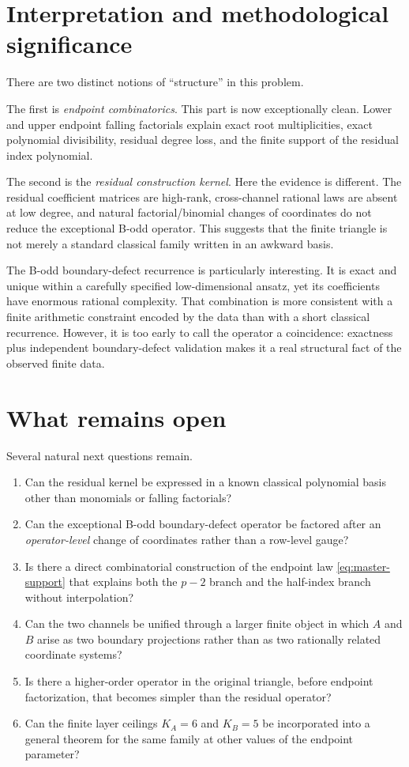 \documentclass[11pt,a4paper]{article}
\begin{document}
\section{Interpretation and methodological significance}

There are two distinct notions of ``structure'' in this problem.

The first is \emph{endpoint combinatorics}.  This part is now exceptionally clean.  Lower and upper endpoint falling factorials explain exact root multiplicities, exact polynomial divisibility, residual degree loss, and the finite support of the residual index polynomial.

The second is the \emph{residual construction kernel}.  Here the evidence is different.  The residual coefficient matrices are high-rank, cross-channel rational laws are absent at low degree, and natural factorial/binomial changes of coordinates do not reduce the exceptional B-odd operator.  This suggests that the finite triangle is not merely a standard classical family written in an awkward basis.

The B-odd boundary-defect recurrence is particularly interesting.  It is exact and unique within a carefully specified low-dimensional ansatz, yet its coefficients have enormous rational complexity.  That combination is more consistent with a finite arithmetic constraint encoded by the data than with a short classical recurrence.  However, it is too early to call the operator a coincidence: exactness plus independent boundary-defect validation makes it a real structural fact of the observed finite data.

\section{What remains open}

Several natural next questions remain.

\begin{enumerate}
  \item Can the residual kernel be expressed in a known classical polynomial basis other than monomials or falling factorials?
  \item Can the exceptional B-odd boundary-defect operator be factored after an \emph{operator-level} change of coordinates rather than a row-level gauge?
  \item Is there a direct combinatorial construction of the endpoint law \eqref{eq:master-support} that explains both the $p-2$ branch and the half-index branch without interpolation?
  \item Can the two channels be unified through a larger finite object in which $A$ and $B$ arise as two boundary projections rather than as two rationally related coordinate systems?
  \item Is there a higher-order operator in the original triangle, before endpoint factorization, that becomes simpler than the residual operator?
  \item Can the finite layer ceilings $K_A=6$ and $K_B=5$ be incorporated into a general theorem for the same family at other values of the endpoint parameter?
\end{enumerate}
\end{document}
